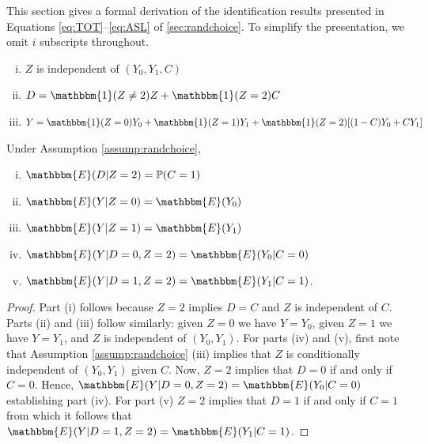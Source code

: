 \documentclass[12pt, a4paper]{article}
\begin{document}
This section gives a formal derivation of the identification results presented in Equations \eqref{eq:TOT}--\eqref{eq:ASL} of \autoref{sec:randchoice}.
To simplify the presentation, we omit $i$ subscripts throughout.

\begin{assumption}\mbox{}
\label{assump:randchoice}
   \begin{enumerate}[(i)]
   \item $Z$ is independent of $(Y_{0}, Y_{1}, C)$
   \item $D = \mathbbm{1}(Z \neq 2)Z + \mathbbm{1}(Z = 2)C$
   \item $Y = \mathbbm{1}(Z = 0) Y_{0} + \mathbbm{1}(Z = 1) Y_{1} + \mathbbm{1}(Z = 2) [ (1 - C) Y_{0} + C Y_{1}]$
   \end{enumerate}
\end{assumption}

\begin{lem}
Under Assumption \ref{assump:randchoice},
\label{lem_randchoice}
   \begin{enumerate}[(i)]
       \item $\mathbbm{E}(D|Z=2) = \mathbb{P}(C=1)$
       \item $\mathbbm{E}(Y|Z=0) = \mathbbm{E}(Y_0)$
       \item $\mathbbm{E}(Y|Z=1) = \mathbbm{E}(Y_1)$
       \item $\mathbbm{E}(Y|D=0,Z=2) = \mathbbm{E}(Y_0|C=0)$
       \item $\mathbbm{E}(Y|D=1,Z=2) = \mathbbm{E}(Y_1|C=1)$.
   \end{enumerate} 
\end{lem}

\begin{proof}
Part (i) follows because $Z=2$ implies $D=C$ and $Z$ is independent of $C$.  
Parts (ii) and (iii) follow similarly: given $Z=0$ we have $Y = Y_0$, given $Z=1$ we have $Y = Y_1$, and $Z$ is independent of $(Y_0,Y_1)$.
For parts (iv) and (v), first note that Assumption \ref{assump:randchoice} (iii) implies that $Z$ is conditionally independent of $(Y_0,Y_1)$ given $C$.
Now, $Z=2$ implies that $D=0$ if and only if $C=0$. Hence, $\mathbbm{E}(Y|D=0, Z=2) = \mathbbm{E}(Y_0|C=0)$ establishing part (iv).
For part (v) $Z=2$ implies that $D=1$ if and only if $C=1$ from which it follows that $\mathbbm{E}(Y|D=1, Z=2) = \mathbbm{E}(Y_1|C=1)$.
\end{proof}
\end{document}
